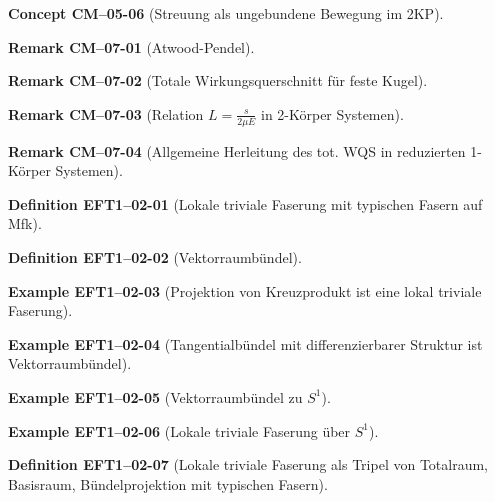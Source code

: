 \documentclass[10pt, letterpaper]{article}
\newcommand{\CustomHeading}[3]{%
  \par\medskip\noindent%
  \textbf{#1 #2} \textnormal{(#3)}.\enskip%
}
\newenvironment{DEF}[2]{\CustomHeading{Definition}{#1}{#2}}{}
\newenvironment{REM}[2]{\CustomHeading{Remark}{#1}{#2}}{}
\newenvironment{EXA}[2]{\CustomHeading{Example}{#1}{#2}}{}
\newenvironment{CONC}[2]{\CustomHeading{Concept}{#1}{#2}}{}
\begin{document}
\begin{CONC}{CM--05-06}{Streuung als ungebundene Bewegung im 2KP}
\end{CONC}

\begin{REM}{CM--07-01}{Atwood-Pendel}
\end{REM}

\begin{REM}{CM--07-02}{Totale Wirkungsquerschnitt für feste Kugel}
\end{REM}

\begin{REM}{CM--07-03}{Relation $L = \frac{s}{2\mu E}$ in 2-Körper Systemen}
\end{REM}

\begin{REM}{CM--07-04}{Allgemeine Herleitung des tot. WQS in reduzierten 1-Körper Systemen}
\end{REM}

\begin{DEF}{EFT1--02-01}{Lokale triviale Faserung mit typischen Fasern auf Mfk}
\end{DEF}

\begin{DEF}{EFT1--02-02}{Vektorraumbündel}
\end{DEF}

\begin{EXA}{EFT1--02-03}{Projektion von Kreuzprodukt ist eine lokal triviale Faserung}
\end{EXA}

\begin{EXA}{EFT1--02-04}{Tangentialbündel mit differenzierbarer Struktur ist Vektorraumbündel}
\end{EXA}

\begin{EXA}{EFT1--02-05}{Vektorraumbündel zu $S^1$}
\end{EXA}

\begin{EXA}{EFT1--02-06}{Lokale triviale Faserung über $S^1$}
\end{EXA}

\begin{DEF}{EFT1--02-07}{Lokale triviale Faserung als Tripel von Totalraum, Basisraum, Bündelprojektion mit typischen Fasern}
\end{DEF}
\end{document}
